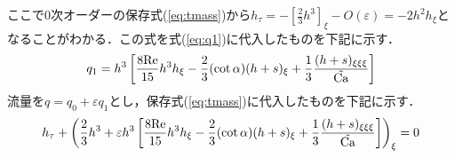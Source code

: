 \documentclass[autodetect-engine,dvipdfmx-if-dvi,ja=standard,a4paper,11pt]{bxjsarticle} %
\begin{document}
ここで0次オーダーの保存式(\ref{eq:tmass})から$h_\tau=-\left[\frac{2}{3}h^3\right]_\xi-O(\varepsilon)=-2h^2h_\xi$となることがわかる．この式を式(\ref{eq:q1})に代入したものを下記に示す．
\begin{equation}
\begin{split}
q_1=h^3\left[\frac{8{\rm Re}}{15}h^3h_\xi-\frac{2}{3}(\cot\alpha)(h+s)_\xi+\frac{1}{3}\frac{(h+s)_{\xi\xi\xi}}{\tilde{\rm Ca}}\right]
\end{split}
\label{eq:q1h}
\end{equation}
流量を$q=q_0+\varepsilon q_1$とし，保存式(\ref{eq:tmass})に代入したものを下記に示す．
\begin{equation}
h_\tau+\left(\frac{2}{3}h^3+\varepsilon h^3\left[\frac{8{\rm Re}}{15}h^3h_\xi-\frac{2}{3}(\cot\alpha)(h+s)_\xi+\frac{1}{3}\frac{(h+s)_{\xi\xi\xi}}{\tilde{\rm Ca}}\right]\right)_\xi=0\label{eq:q1mass}
\end{equation}
\end{document}
